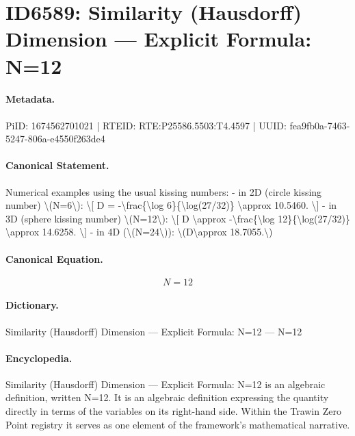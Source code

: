 \section*{ID6589: Similarity (Hausdorff) Dimension — Explicit Formula: N=12}
\paragraph{Metadata.}
PiID: 1674562701021 | RTEID: RTE:P25586.5503:T4.4597 | UUID: fea9fb0a-7463-5247-806a-e4550f263de4

\paragraph{Canonical Statement.}
Numerical examples using the usual kissing numbers: - in 2D (circle kissing number) \textbackslash{}(N=6\textbackslash{}): \textbackslash{}[ D = -\textbackslash{}frac\{\textbackslash{}log 6\}\{\textbackslash{}log(27/32)\} \textbackslash{}approx 10.5460. \textbackslash{}] - in 3D (sphere kissing number) \textbackslash{}(N=12\textbackslash{}): \textbackslash{}[ D \textbackslash{}approx -\textbackslash{}frac\{\textbackslash{}log 12\}\{\textbackslash{}log(27/32)\} \textbackslash{}approx 14.6258. \textbackslash{}] - in 4D (\textbackslash{}(N=24\textbackslash{})): \textbackslash{}(D\textbackslash{}approx 18.7055.\textbackslash{})

\paragraph{Canonical Equation.}
\[
N=12
\]

\paragraph{Dictionary.}
Similarity (Hausdorff) Dimension — Explicit Formula: N=12 — N=12

\paragraph{Encyclopedia.}
Similarity (Hausdorff) Dimension — Explicit Formula: N=12 is an algebraic definition, written N=12. It is an algebraic definition expressing the quantity directly in terms of the variables on its right-hand side. Within the Trawin Zero Point registry it serves as one element of the framework's mathematical narrative.

